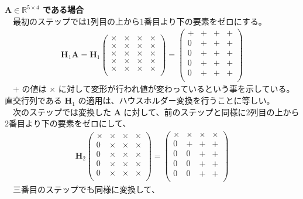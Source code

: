\documentclass[a4paper,10pt]{jarticle}
\begin{document}
\textbf{\(\bm{A}\in\mathbb{R}^{5\times 4}\) である場合}\\
　最初のステップでは1列目の上から1番目より下の要素をゼロにする。\\
\begin{align*}
\bm{H}_1\bm{A} = \bm{H}_1
\begin{pmatrix}
\times & \times & \times & \times \\
\times & \times & \times & \times \\
\times & \times & \times & \times \\
\times & \times & \times & \times \\
\times & \times & \times & \times \\
\end{pmatrix}
=
\begin{pmatrix}
+ & + & + & + \\
0 & + & + & + \\
0 & + & + & + \\
0 & + & + & + \\
0 & + & + & + \\
\end{pmatrix}
\end{align*}
　\(+\) の値は \(\times\) に対して変形が行われ値が変わっているという事を示している。直交行列である \(\bm{H}_1\) の適用は、ハウスホルダー変換を行うことに等しい。\\
　次のステップでは変換した \(\bm{A}\) に対して、前のステップと同様に2列目の上から2番目より下の要素をゼロにして、\\
\begin{align*}
\bm{H}_2
\begin{pmatrix}
\times & \times & \times & \times \\
0 & \times & \times & \times \\
0 & \times & \times & \times \\
0 & \times & \times & \times \\
0 & \times & \times & \times \\
\end{pmatrix}
=
\begin{pmatrix}
\times & \times & \times & \times \\
0 & + & + & + \\
0 & 0 & + & + \\
0 & 0 & + & + \\
0 & 0 & + & + \\
\end{pmatrix}
\end{align*}
　三番目のステップでも同様に変換して、\\
\end{document}
